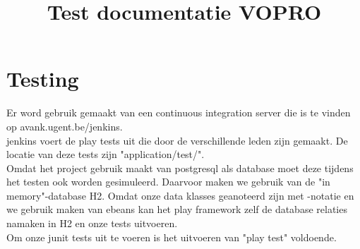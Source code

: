 \documentclass[10pt,a4paper]{article}
\title{Test documentatie VOPRO}
\begin{document}
\section*{Testing}
Er word gebruik gemaakt van een continuous integration server die is te vinden op avank.ugent.be/jenkins.\\
jenkins voert de play tests uit die door de verschillende leden zijn gemaakt. De locatie van deze tests zijn "application/test/". \\

Omdat het project gebruik maakt van postgresql als database moet deze tijdens het testen ook worden gesimuleerd. Daarvoor maken we gebruik van de "in memory"-database H2. Omdat onze data klasses geanoteerd zijn met \@ -notatie en we gebruik maken van ebeans kan het play framework zelf de database relaties namaken in H2 en onze tests uitvoeren.\\

Om onze junit tests uit te voeren is het uitvoeren van "play test" voldoende.
\end{document}
